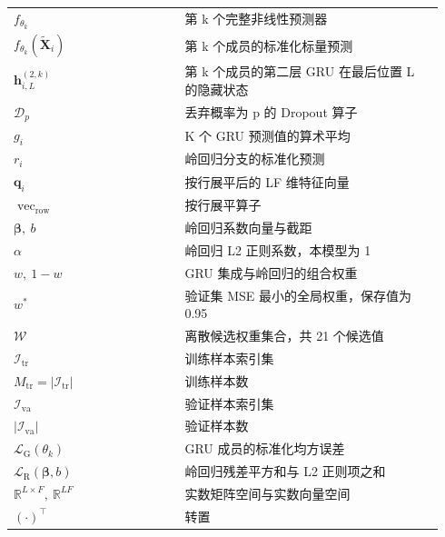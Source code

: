 \documentclass[UTF8,a4paper,11pt]{ctexart}
\begin{document}
\begin{longtable}{>{\raggedright\arraybackslash}p{0.37\linewidth}p{0.57\linewidth}}
$f_{\theta_k}$ & 第 k 个完整非线性预测器 \\
$f_{\theta_k}(\widetilde{\mathbf{X}}_i)$ & 第 k 个成员的标准化标量预测 \\
$\mathbf{h}_{i,L}^{(2,k)}$ & 第 k 个成员的第二层 GRU 在最后位置 L 的隐藏状态 \\
$\mathcal{D}_p$ & 丢弃概率为 p 的 Dropout 算子 \\
$g_i$ & K 个 GRU 预测值的算术平均 \\
$r_i$ & 岭回归分支的标准化预测 \\
$\mathbf{q}_i$ & 按行展平后的 LF 维特征向量 \\
$\operatorname{vec}_{\mathrm{row}}$ & 按行展平算子 \\
$\boldsymbol{\beta},\ b$ & 岭回归系数向量与截距 \\
$\alpha$ & 岭回归 L2 正则系数，本模型为 1 \\
$w,\ 1-w$ & GRU 集成与岭回归的组合权重 \\
$w^*$ & 验证集 MSE 最小的全局权重，保存值为 0.95 \\
$\mathcal{W}$ & 离散候选权重集合，共 21 个候选值 \\
$\mathcal{I}_{\mathrm{tr}}$ & 训练样本索引集 \\
$M_{\mathrm{tr}}=|\mathcal{I}_{\mathrm{tr}}|$ & 训练样本数 \\
$\mathcal{I}_{\mathrm{va}}$ & 验证样本索引集 \\
$|\mathcal{I}_{\mathrm{va}}|$ & 验证样本数 \\
$\mathcal{L}_{\mathrm{G}}(\theta_k)$ & GRU 成员的标准化均方误差 \\
$\mathcal{L}_{\mathrm{R}}(\boldsymbol{\beta},b)$ & 岭回归残差平方和与 L2 正则项之和 \\
$\mathbb{R}^{L\times F},\ \mathbb{R}^{LF}$ & 实数矩阵空间与实数向量空间 \\
$(\cdot)^\top$ & 转置 \\

\end{longtable}
\end{document}
